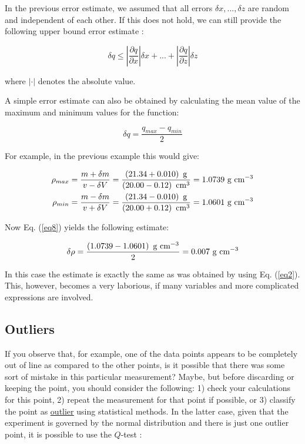 \documentclass[byrevtex,amssymb,aps,pra,floatfix,letterpaper]{revtex4}
\begin{document}
In the previous error estimate, we assumed that all errors $\delta x, ..., \delta z$ are random and independent of each other. If this does not hold, we can still provide the following upper bound error estimate \cite{TAYLOR}:

\begin{equation}
\label{eq7}
\delta q \le \left|\frac{\partial q}{\partial x}\right|\delta x + ... + \left|\frac{\partial q}{\partial z}\right|\delta z
\end{equation}

\noindent
where $\left| \cdot \right|$ denotes the absolute value.

A simple error estimate can also be obtained by calculating the mean value of the maximum and minimum values for the function:

\begin{equation}
\label{eq8}
\delta q = \frac{q_{max} - q_{min}}{2}
\end{equation}

\noindent
For example, in the previous example this would give:

\begin{eqnarray}
\label{eq9}
\rho_{max} = \frac{m + \delta m}{v - \delta V} = \frac{\left(21.34 + 0.010\right)\textnormal{ g}}{\left(20.00 - 0.12\right)\textnormal{ cm}^3} = 1.0739\textnormal{ g cm}^{-3}\\
\nonumber
\rho_{min} = \frac{m - \delta m}{v + \delta V} = \frac{\left(21.34 - 0.010\right)\textnormal{ g}}{\left(20.00 + 0.12\right)\textnormal{ cm}^3} = 1.0601\textnormal{ g cm}^{-3}
\end{eqnarray}

\noindent
Now Eq. (\ref{eq8}) yields the following estimate:

\begin{equation}
\label{eq10}
\delta\rho = \frac{\left(1.0739 - 1.0601\right)\textnormal{ g cm}^{-3}}{2} = 0.007\textnormal{ g cm}^{-3}
\end{equation}

\noindent
In this case the estimate is exactly the same as was obtained by using Eq. (\ref{eq2}). This, however, becomes a very laborious, if many variables and more complicated expressions are involved.

\subsection{Outliers}

If you observe that, for example, one of the data points appears to be completely out of line as compared to the other points, is it possible that there was some sort of mistake in this particular measurement? Maybe, but before discarding or keeping the point, you should consider the following: 1) check your calculations for this point, 2) repeat the measurement for that point if possible, or 3) classify the point as \href{http://en.wikipedia.org/wiki/Outlier}{\underline{outlier}} using statistical methods. In the latter case, given that the experiment is governed by the normal distribution and there is just one outlier point, it is possible to use the $Q$-test \cite{MCBANE}:
\end{document}
